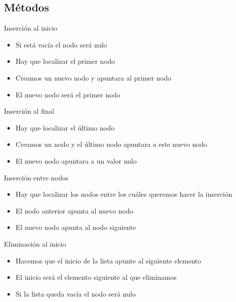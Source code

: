 \documentclass{beamer}
\begin{document}
\subsection{M\'etodos}

\begin{frame}{Inserci\'on al inicio}
	\begin{itemize}
		\item Si est\'a vac\'ia el nodo ser\'a nulo
		\item Hay que localizar el primer nodo
		\item Creamos un nuevo nodo y apuntara al primer nodo
		\item El nuevo nodo será el primer nodo
	\end{itemize}
	\centering
\end{frame}

\begin{frame}{Inserci\'on al final}
	\begin{itemize}
		\item Hay que localizar el \'ultimo  nodo
		\item Creamos un nodo y el \'ultimo nodo apuntara a este nuevo nodo
		\item El nuevo nodo apuntara a un valor nulo
	\end{itemize}
	\centering
\end{frame}

\begin{frame}{Inserci\'on entre nodos}
	\begin{itemize}
		\item Hay que localizar los nodos entre los cu\'ales queremos hacer la inserci\'on
		\item El nodo anterior apunta al nuevo nodo
		\item El nuevo nodo apunta al nodo siguiente
	\end{itemize}
	\centering
\end{frame}

\begin{frame}{Eliminaci\'on al inicio}
	\begin{itemize}
		\item Hacemos que el inicio de la lista apunte al siguiente elemento
		\item El inicio ser\'a el elemento siguiente al que eliminamos
		\item Si la lista queda vacía el nodo será nulo
	\end{itemize}
	\centering
\end{frame}
\end{document}
